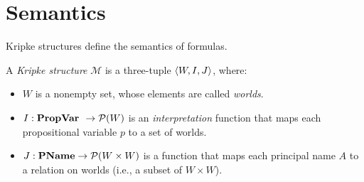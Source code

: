 \section{Semantics}
\label{sec:semantics}


Kripke structures define the semantics of formulas.


\begin{definition}
    A \emph{Kripke structure} $\mathcal{M}$ is a three-tuple
  $\langle {W,I,J} \rangle$, where:
  \begin{itemize}
  \item $W$ is a nonempty set, whose elements are called \emph{worlds}. 
    
  \item $I: \textbf{PropVar } \rightarrow \mathcal{P}(W)$ is an \emph{interpretation}
    function that maps each propositional variable $p$ to a set of
    worlds.

  \item $J: \textbf{PName} \rightarrow \mathcal{P}(W\times W)$ is a function that maps each
    principal name $A$ to a relation on worlds (i.e., a subset of
    $W\times W$).
  \end{itemize}
 
\end{definition}

